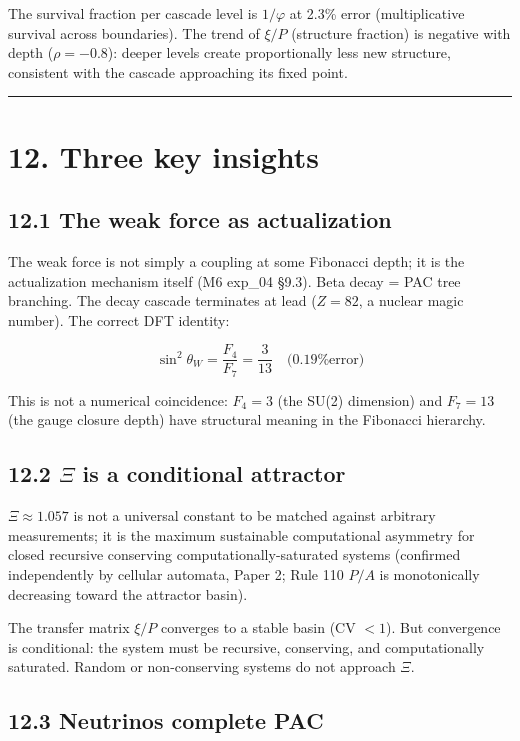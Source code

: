 \documentclass[11pt,a4paper]{article}
\begin{document}
The survival fraction per cascade level is $1/\varphi$ at 2.3\% error (multiplicative survival across boundaries). The trend of $\xi/P$ (structure fraction) is negative with depth ($\rho = -0.8$): deeper levels create proportionally less new structure, consistent with the cascade approaching its fixed point.

\begin{center}\rule{0.5\linewidth}{0.4pt}\end{center}

\section*{12. Three key insights}

\subsection*{12.1 The weak force as actualization}

The weak force is not simply a coupling at some Fibonacci depth; it is the actualization mechanism itself (M6 exp\_04 §9.3). Beta decay = PAC tree branching. The decay cascade terminates at lead ($Z = 82$, a nuclear magic number). The correct DFT identity:

\[\sin^2\theta_W = \frac{F_4}{F_7} = \frac{3}{13} \quad \text{(0.19\% error)}\]

This is not a numerical coincidence: $F_4 = 3$ (the SU(2) dimension) and $F_7 = 13$ (the gauge closure depth) have structural meaning in the Fibonacci hierarchy.

\subsection*{12.2 $\Xi$ is a conditional attractor}

$\Xi \approx 1.057$ is not a universal constant to be matched against arbitrary measurements; it is the maximum sustainable computational asymmetry for closed recursive conserving computationally-saturated systems (confirmed independently by cellular automata, Paper 2; Rule 110 $P/A$ is monotonically decreasing toward the attractor basin).

The transfer matrix $\xi/P$ converges to a stable basin (CV $< 1$). But convergence is conditional: the system must be recursive, conserving, and computationally saturated. Random or non-conserving systems do not approach $\Xi$.

\subsection*{12.3 Neutrinos complete PAC}
\end{document}
